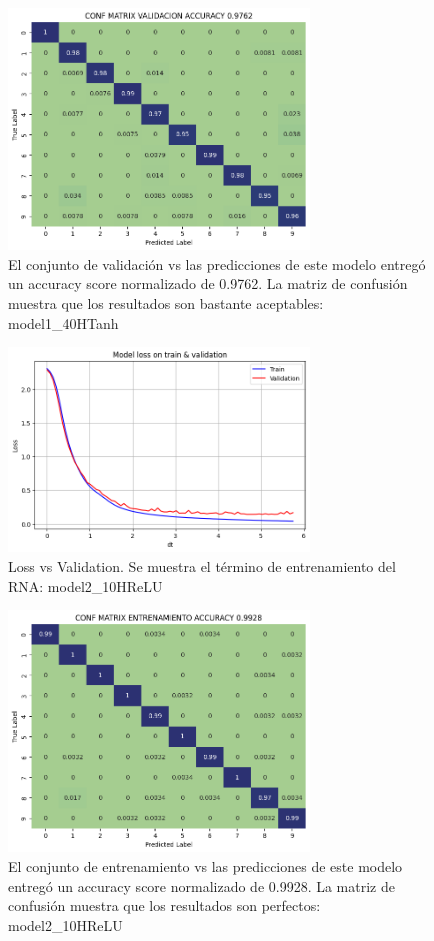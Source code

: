 \documentclass[journal]{IEEEtai}
\begin{document}
\begin{figure}[H]
\centering
\includegraphics[width=8cm]{img/model40HTanh/val.png}
\caption{El conjunto de validación vs las predicciones de este modelo entregó un accuracy score normalizado de  0.9762. La matriz de confusión muestra que los resultados son bastante aceptables: model1\_40HTanh}
\label{fig: model140HTanhVAL}
\end{figure}

\begin{figure}[H]
\centering
\includegraphics[width=8cm]{img/model210HReLU/lossvsval.png}
\caption{Loss vs Validation. Se muestra el término de entrenamiento del RNA: model2\_10HReLU}
\label{fig: model210HReLULULOSSVSVAL}
\end{figure}

\begin{figure}[H]
\centering
\includegraphics[width=8cm]{img/model210HReLU/train.png}
\caption{El conjunto de entrenamiento vs las predicciones de este modelo entregó un accuracy score normalizado de  0.9928. La matriz de confusión muestra que los resultados son perfectos: model2\_10HReLU}
\label{fig: model210HReLUTRAIN}
\end{figure}
\end{document}
